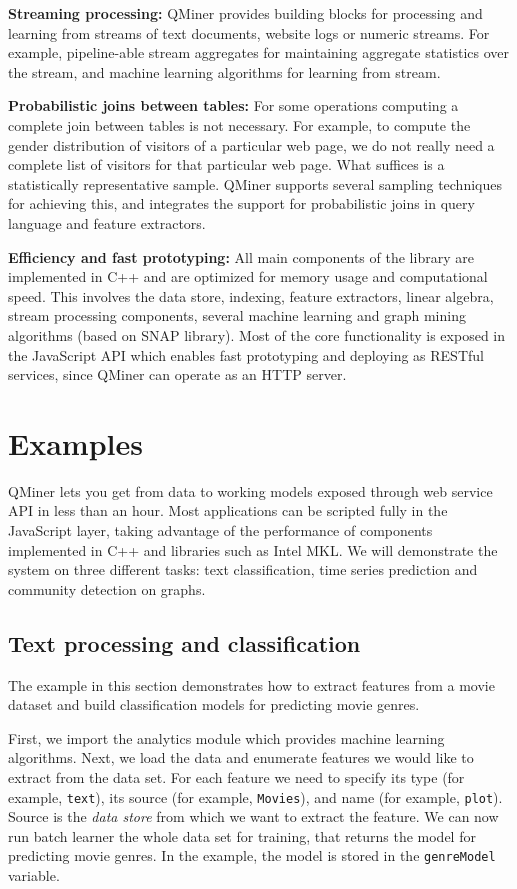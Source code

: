 \documentclass{article} %
\begin{document}
\textbf{Streaming processing:} QMiner provides building blocks for processing and learning from streams of text documents, website logs or numeric streams. For example, pipeline-able stream aggregates for maintaining aggregate statistics over the stream, and machine learning algorithms for learning from stream.

\textbf{Probabilistic joins between tables:} For some operations computing a complete join between tables is not necessary. For example, to compute the gender distribution of visitors of a particular web page, we do not really need a complete list of visitors for that particular web page. What suffices is a statistically representative sample. QMiner supports several sampling techniques for achieving this, and integrates the support for probabilistic joins in query language and feature extractors.

\textbf{Efficiency and fast prototyping:} All main components of the library are implemented in C++ and are optimized for memory usage and computational speed. This involves the data store, indexing, feature extractors, linear algebra, stream processing components, several machine learning and graph mining algorithms (based on SNAP library). Most of the core functionality is exposed in the JavaScript API which enables fast prototyping and deploying as RESTful services, since QMiner can operate as an HTTP server.


\section{Examples}

QMiner lets you get from data to working models exposed through web service API in less than an hour. Most applications can be scripted fully in the JavaScript layer, taking advantage of the performance of components implemented in C++ and libraries such as Intel MKL. We will demonstrate the system on three different tasks: text classification, time series prediction and community detection on graphs.

\subsection{Text processing and classification}

The example in this section demonstrates how to extract features from a movie dataset and build classification models for predicting movie genres.

First, we import the analytics module which provides machine learning algorithms. Next, we load the data and enumerate features we would like to extract from the data set. For each feature we need to specify its type (for example, \texttt{text}), its source (for example, \texttt{Movies}), and name (for example, \texttt{plot}). Source is the \emph{data store} from which we want to extract the feature. We can now run batch learner the whole data set for training, that returns the model for predicting movie genres. In the example, the model is stored in the \texttt{genreModel} variable.
\end{document}
